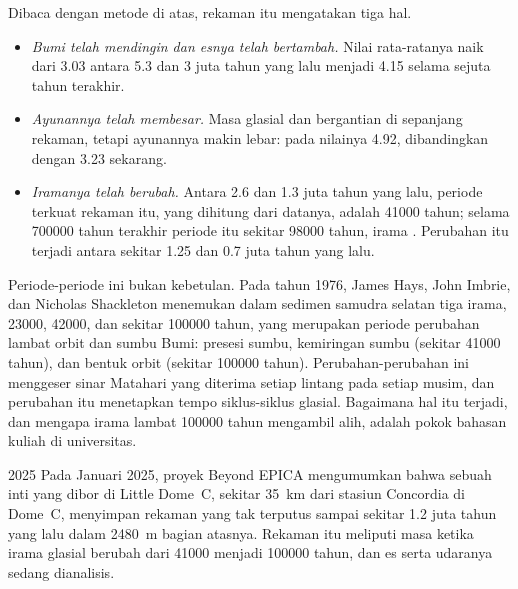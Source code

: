 Dibaca dengan metode di atas, rekaman itu mengatakan tiga hal.
\begin{itemize}
  \item \emph{Bumi telah mendingin dan esnya telah bertambah.} Nilai
        rata-ratanya naik dari \qty{3.03}{\permil} antara 5.3 dan 3 juta tahun
        yang lalu menjadi \qty{4.15}{\permil} selama sejuta tahun terakhir.
  \item \emph{Ayunannya telah membesar.} Masa glasial dan 
        bergantian di sepanjang rekaman, tetapi ayunannya makin lebar: pada
         nilainya \qty{4.92}{\permil}, dibandingkan
        dengan \qty{3.23}{\permil} sekarang.
  \item \emph{Iramanya telah berubah.} Antara 2.6 dan 1.3 juta tahun yang
        lalu, periode terkuat rekaman itu, yang dihitung dari datanya, adalah
        \num{41000} tahun; selama \num{700000} tahun terakhir periode itu sekitar
        \num{98000} tahun, irama . Perubahan itu terjadi antara sekitar
        1.25 dan 0.7 juta tahun yang lalu.
\end{itemize}

Periode-periode ini bukan kebetulan. Pada tahun 1976, James Hays, John Imbrie,
dan Nicholas Shackleton menemukan dalam sedimen samudra selatan tiga irama,
\num{23000}, \num{42000}, dan sekitar \num{100000} tahun, yang merupakan
periode perubahan lambat orbit dan sumbu Bumi: presesi sumbu, kemiringan sumbu
(sekitar \num{41000} tahun), dan bentuk orbit (sekitar \num{100000} tahun).
Perubahan-perubahan ini menggeser sinar Matahari yang diterima setiap lintang
pada setiap musim, dan perubahan itu menetapkan tempo siklus-siklus glasial.
Bagaimana hal itu terjadi, dan mengapa irama lambat \num{100000} tahun
mengambil alih, adalah pokok bahasan kuliah di universitas.

\begin{dated}{2025}
Pada Januari 2025, proyek Beyond EPICA mengumumkan bahwa sebuah inti yang dibor
di Little Dome~C, sekitar \qty{35}{km} dari stasiun Concordia di Dome~C,
menyimpan rekaman yang tak terputus sampai sekitar 1.2 juta tahun yang lalu
dalam \qty{2480}{m} bagian atasnya. Rekaman itu meliputi masa
ketika irama glasial berubah dari \num{41000} menjadi \num{100000} tahun, dan
es serta udaranya sedang dianalisis.
\end{dated}

